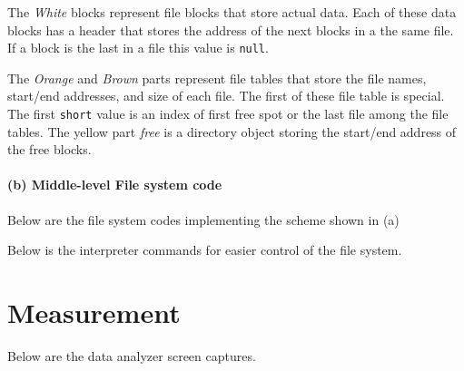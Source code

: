 \documentclass[a4paper]{article}
\begin{document}
The \emph{White} blocks represent file blocks that store actual data. Each of these data blocks has a header
that stores the address of the next blocks in a the same file. If a block is the last in a file this value is \texttt{null}.

The \emph{Orange} and \emph{Brown} parts represent file tables that store the file names, start/end addresses, and size of each file. The first of these file table is special. The first \texttt{short} value is an index of first free spot or the last file among the file tables. The yellow part \emph{free} is a directory object storing the start/end address of the free blocks.

\paragraph{(b) Middle-level File system code}
Below are the file system codes implementing the scheme shown in (a)

\lstset{language=C, style=MyCStyle}




Below is the interpreter commands for easier control of the file system.


\section{Measurement}
Below are the data analyzer screen captures.
\end{document}
